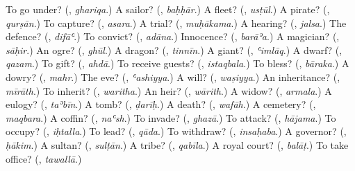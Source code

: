 \begin{tcolorbox}[breakable,colback=teal!4,colframe=teal!35!black,title={Before you move on}]
To go under? (\textbf{}, \emph{ghariqa}.) A sailor? (\textbf{}, \emph{baḥḥār}.) A fleet? (\textbf{}, \emph{usṭūl}.) A pirate? (\textbf{}, \emph{qurṣān}.) To capture? (\textbf{}, \emph{asara}.) A trial? (\textbf{}, \emph{muḥākama}.) A hearing? (\textbf{}, \emph{jalsa}.) The defence? (\textbf{}, \emph{difāʿ}.) To convict? (\textbf{}, \emph{adāna}.) Innocence? (\textbf{}, \emph{barāʾa}.) A magician? (\textbf{}, \emph{sāḥir}.) An ogre? (\textbf{}, \emph{ghūl}.) A dragon? (\textbf{}, \emph{tinnīn}.) A giant? (\textbf{}, \emph{ʿimlāq}.) A dwarf? (\textbf{}, \emph{qazam}.) To gift? (\textbf{}, \emph{ahdā}.) To receive guests? (\textbf{}, \emph{istaqbala}.) To bless? (\textbf{}, \emph{bāraka}.) A dowry? (\textbf{}, \emph{mahr}.) The eve? (\textbf{}, \emph{ʿashiyya}.) A will? (\textbf{}, \emph{waṣiyya}.) An inheritance? (\textbf{}, \emph{mīrāth}.) To inherit? (\textbf{}, \emph{waritha}.) An heir? (\textbf{}, \emph{wārith}.) A widow? (\textbf{}, \emph{armala}.) A eulogy? (\textbf{}, \emph{taʾbīn}.) A tomb? (\textbf{}, \emph{ḍarīḥ}.) A death? (\textbf{}, \emph{wafāh}.) A cemetery? (\textbf{}, \emph{maqbara}.) A coffin? (\textbf{}, \emph{naʿsh}.) To invade? (\textbf{}, \emph{ghazā}.) To attack? (\textbf{}, \emph{hājama}.) To occupy? (\textbf{}, \emph{iḥtalla}.) To lead? (\textbf{}, \emph{qāda}.) To withdraw? (\textbf{}, \emph{insaḥaba}.) A governor? (\textbf{}, \emph{ḥākim}.) A sultan? (\textbf{}, \emph{sulṭān}.) A tribe? (\textbf{}, \emph{qabīla}.) A royal court? (\textbf{}, \emph{balāṭ}.) To take office? (\textbf{}, \emph{tawallā}.)
\end{tcolorbox}
